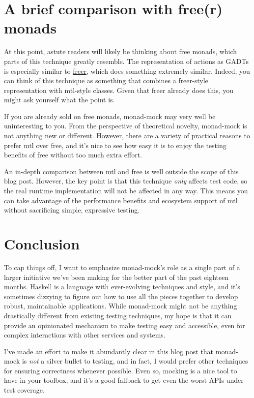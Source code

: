 \hypertarget{a-brief-comparison-with-freer-monads}{%
\section{A brief comparison with free(r)
monads}\label{a-brief-comparison-with-freer-monads}}

At this point, astute readers will likely be thinking about free monads,
which parts of this technique greatly resemble. The representation of
actions as GADTs is especially similar to
\href{https://hackage.haskell.org/package/freer}{freer}, which does
something extremely similar. Indeed, you can think of this technique as
something that combines a freer-style representation with mtl-style
classes. Given that freer already does this, you might ask yourself what
the point is.

If you are already sold on free monads, monad-mock may very well be
uninteresting to you. From the perspective of theoretical novelty,
monad-mock is not anything new or different. However, there are a
variety of practical reasons to prefer mtl over free, and it's nice to
see how easy it is to enjoy the testing benefits of free without too
much extra effort.

An in-depth comparison between mtl and free is well outside the scope of
this blog post. However, the key point is that this technique
\emph{only} affects test code, so the real runtime implementation will
not be affected in any way. This means you can take advantage of the
performance benefits and ecosystem support of mtl without sacrificing
simple, expressive testing.

\hypertarget{conclusion}{%
\section{Conclusion}\label{conclusion}}

To cap things off, I want to emphasize monad-mock's role as a single
part of a larger initiative we've been making for the better part of the
past eighteen months. Haskell is a language with ever-evolving
techniques and style, and it's sometimes dizzying to figure out how to
use all the pieces together to develop robust, maintainable
applications. While monad-mock might not be anything drastically
different from existing testing techniques, my hope is that it can
provide an opinionated mechanism to make testing easy and accessible,
even for complex interactions with other services and systems.

I've made an effort to make it abundantly clear in this blog post that
monad-mock is \emph{not} a silver bullet to testing, and in fact, I
would prefer other techniques for ensuring correctness whenever
possible. Even so, mocking is a nice tool to have in your toolbox, and
it's a good fallback to get even the worst APIs under test coverage.

